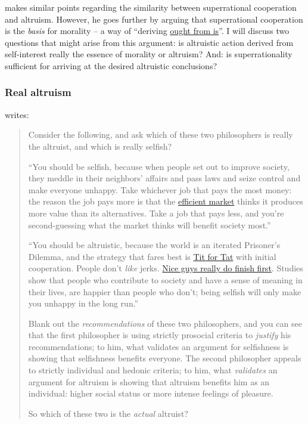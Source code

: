 \citet[ch. 7.2.1]{Drescher2006-ky} makes similar points regarding the similarity
between superrational cooperation and altruism. However, he goes
further by arguing that superrational cooperation is the \emph{basis}
for morality -- a way of ``deriving
\href{https://en.wikipedia.org/wiki/Is\%E2\%80\%93ought_problem}{ought
from is}''. I will discuss two questions that might arise
from this argument: is altruistic action derived from self-interest
really the essence of morality or altruism? And: is superrationality
sufficient for arriving at the desired altruistic conclusions?

\hypertarget{real-altruism}{\subsubsection{Real
altruism}\label{real-altruism}}

\citet[ch. 259]{Yudkowsky2015-tz} writes:

\begin{quote}
Consider the following, and ask which of these two philosophers is
really the altruist, and which is really selfish?

``You should be selfish, because when people set out to improve society,
they meddle in their neighbors' affairs and pass laws and seize control
and make everyone unhappy. Take whichever job that pays the most money:
the reason the job pays more is that the
\href{https://en.wikipedia.org/wiki/Efficient-market_hypothesis}{efficient
market} thinks it produces more value than its alternatives. Take a job
that pays less, and you're second-guessing what the market thinks will
benefit society most.''

``You should be altruistic, because the world is an iterated Prisoner's
Dilemma, and the strategy that fares best is
\href{https://en.wikipedia.org/wiki/Tit_for_tat}{Tit for Tat}
with initial cooperation. People don't \emph{like} jerks.
\href{https://en.wikipedia.org/wiki/Nice_Guys_Finish_First}{Nice
guys really do finish first}. Studies show that people who contribute
to society and have a sense of meaning in their lives, are happier than
people who don't; being selfish will only make you unhappy in the long
run.''

Blank out the \emph{recommendations} of these two philosophers, and you
can see that the first philosopher is using strictly prosocial criteria
to \emph{justify} his recommendations; to him, what validates an
argument for selfishness is showing that selfishness benefits everyone.
The second philosopher appeals to strictly individual and hedonic
criteria; to him, what \emph{validates} an argument for altruism is
showing that altruism benefits him as an individual: higher social
status or more intense feelings of pleasure.

So which of these two is the \emph{actual} altruist?
\end{quote}


